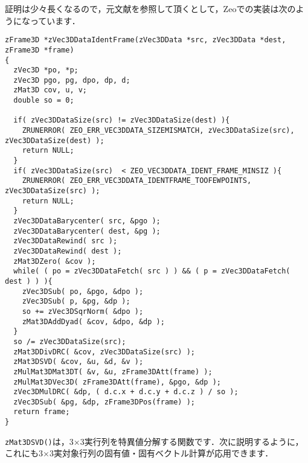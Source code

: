 ﻿\documentclass[a4paper]{jsarticle}
\begin{document}
証明は少々長くなるので，元文献を参照して頂くとして，Zeoでの実装は次のようになっています．
\begin{screen}
\begin{verbatim}
zFrame3D *zVec3DDataIdentFrame(zVec3DData *src, zVec3DData *dest, zFrame3D *frame)
{
  zVec3D *po, *p;
  zVec3D pgo, pg, dpo, dp, d;
  zMat3D cov, u, v;
  double so = 0;

  if( zVec3DDataSize(src) != zVec3DDataSize(dest) ){
    ZRUNERROR( ZEO_ERR_VEC3DDATA_SIZEMISMATCH, zVec3DDataSize(src), zVec3DDataSize(dest) );
    return NULL;
  }
  if( zVec3DDataSize(src)  < ZEO_VEC3DDATA_IDENT_FRAME_MINSIZ ){
    ZRUNERROR( ZEO_ERR_VEC3DDATA_IDENTFRAME_TOOFEWPOINTS, zVec3DDataSize(src) );
    return NULL;
  }
  zVec3DDataBarycenter( src, &pgo );
  zVec3DDataBarycenter( dest, &pg );
  zVec3DDataRewind( src );
  zVec3DDataRewind( dest );
  zMat3DZero( &cov );
  while( ( po = zVec3DDataFetch( src ) ) && ( p = zVec3DDataFetch( dest ) ) ){
    zVec3DSub( po, &pgo, &dpo );
    zVec3DSub( p, &pg, &dp );
    so += zVec3DSqrNorm( &dpo );
    zMat3DAddDyad( &cov, &dpo, &dp );
  }
  so /= zVec3DDataSize(src);
  zMat3DDivDRC( &cov, zVec3DDataSize(src) );
  zMat3DSVD( &cov, &u, &d, &v );
  zMulMat3DMat3DT( &v, &u, zFrame3DAtt(frame) );
  zMulMat3DVec3D( zFrame3DAtt(frame), &pgo, &dp );
  zVec3DMulDRC( &dp, ( d.c.x + d.c.y + d.c.z ) / so );
  zVec3DSub( &pg, &dp, zFrame3DPos(frame) );
  return frame;
}
\end{verbatim}
\end{screen}

\verb|zMat3DSVD()|は，3×3実行列を特異値分解する関数です．次に説明するように，これにも3×3実対象行列の固有値・固有ベクトル計算が応用できます．
\end{document}
